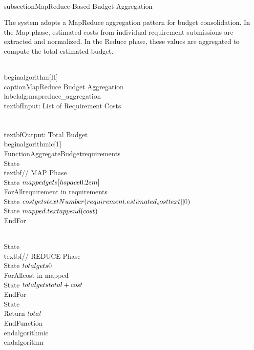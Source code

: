 \\subsection{MapReduce-Based Budget Aggregation}

The system adopts a MapReduce aggregation pattern for budget consolidation. In the Map phase, estimated costs from individual requirement submissions are extracted and normalized. In the Reduce phase, these values are aggregated to compute the total estimated budget.

\\begin{algorithm}[H]
\\caption{MapReduce Budget Aggregation}
\\label{alg:mapreduce_aggregation}
\\textbf{Input:} List of Requirement Costs\\\\
\\textbf{Output:} Total Budget
\\begin{algorithmic}[1]
\\Function{AggregateBudget}{requirements}
    \\State \\textbf{// MAP Phase}
    \\State $mapped \\gets [\\hspace{0.2em}]$
    \\ForAll{requirement in requirements}
        \\State $cost \\gets \\text{Number}(requirement.estimated\\_cost \\text{ || } 0)$
        \\State $mapped.\\text{append}(cost)$
    \\EndFor
    
    \\State \\textbf{// REDUCE Phase}
    \\State $total \\gets 0$
    \\ForAll{cost in mapped}
        \\State $total \\gets total + cost$
    \\EndFor
    \\State \\Return $total$
\\EndFunction
\\end{algorithmic}
\\end{algorithm}

